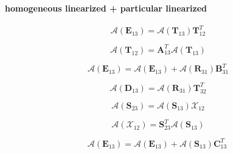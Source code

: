 \paragraph{homogeneous linearized + particular linearized}
\label{sec:adding-downward-adjoint_of_tangent_linear-homogeneous_linearized_p_particular_linearized}

\begin{equation}
\mathcal{A}(\mathbf{E}_{13}) = \mathcal{A}(\mathbf{T}_{13})\mathbf{T}^{T}_{12}
\label{eq:adding-downward-adjoint_of_tangent_linear-homogeneous_linearized_p_particular_linearized-E13_a}
\end{equation}

\begin{equation}
\mathcal{A}(\mathbf{T}_{12}) = \mathbf{A}^{T}_{13}\mathcal{A}(\mathbf{T}_{13})
\label{eq:adding-downward-adjoint_of_tangent_linear-homogeneous_linearized_p_particular_linearized-T12_a}
\end{equation}

\begin{equation}
\mathcal{A}(\mathbf{E}_{13}) = \mathcal{A}(\mathbf{E}_{13}) + \mathcal{A}(\mathbf{R}_{31})\mathbf{B}^{T}_{31}
\label{eq:adding-downward-adjoint_of_tangent_linear-homogeneous_linearized_p_particular_linearized-E13_a2}
\end{equation}

\begin{equation}
\mathcal{A}(\mathbf{D}_{13}) = \mathcal{A}(\mathbf{R}_{31})\mathbf{T}^{T}_{32}
\label{eq:adding-downward-adjoint_of_tangent_linear-homogeneous_linearized_p_particular_linearized-D13_a}
\end{equation}

\begin{equation}
\mathcal{A}(\mathbf{S}_{23}) = \mathcal{A}(\mathbf{S}_{13})\mathcal{X}_{12}
\label{eq:adding-downward-adjoint_of_tangent_linear-homogeneous_linearized_p_particular_linearized-S23_a}
\end{equation}

\begin{equation}
\mathcal{A}(\mathcal{X}_{12}) = \mathbf{S}^{T}_{23}\mathcal{A}(\mathbf{S}_{13})
\label{eq:adding-downward-adjoint_of_tangent_linear-homogeneous_linearized_p_particular_linearized-t12_a}
\end{equation}

\begin{equation}
\mathcal{A}(\mathbf{E}_{13}) = \mathcal{A}(\mathbf{E}_{13}) + \mathcal{A}(\mathbf{S}_{13})\mathbf{C}^{T}_{13}\
\label{eq:adding-downward-adjoint_of_tangent_linear-homogeneous_linearized_p_particular_linearized-E13_a3}
\end{equation}

